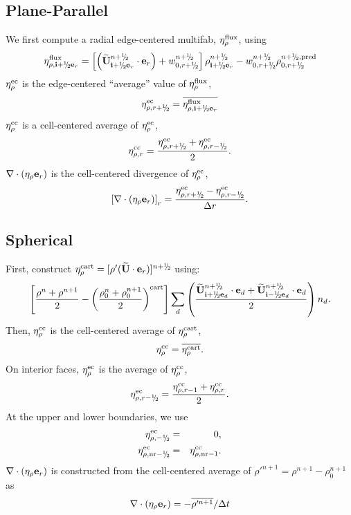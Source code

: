 \subsection{Plane-Parallel}
We first compute a radial edge-centered multifab, $\eta_{\rho}^{\rm flux}$, using
\begin{equation}
\eta_{\rho,\ib+\myhalf\eb_r}^{\rm flux} = \left[\left(\Ubt_{\ib+\myhalf\eb_r}^{n+\myhalf}\cdot\eb_r\right) + w_{0,r+\myhalf}^{n+\myhalf}\right] \rho_{\ib+\myhalf\eb_r}^{n+\myhalf} - w_{0,r+\myhalf}^{n+\myhalf}\rho_{0,r+\myhalf}^{n+\myhalf, {\rm pred}}
\end{equation}
$\eta_{\rho}^{\rm ec}$ is the edge-centered ``average'' value of $\eta_{\rho}^{\rm flux}$,
\begin{equation}
\eta_{\rho,r+\myhalf}^{\rm ec} = \overline{\eta_{\rho,\ib+\myhalf\eb_r}^{\rm flux}}
\end{equation}
$\eta_{\rho}^{\rm cc}$ is a cell-centered average of $\eta_{\rho}^{\rm ec}$,
\begin{equation}
\eta_{\rho,r}^{\rm cc} = \frac{\eta_{\rho,r+\myhalf}^{\rm ec} + \eta_{\rho,r-\myhalf}^{\rm ec}}{2}.
\end{equation}
$\nabla\cdot(\eta_{\rho}{\bf e}_r)$ is the cell-centered divergence of $\eta_{\rho}^{\rm ec}$,
\begin{equation}
\left[\divetarho\right]_r = \frac{\eta_{\rho,r+\myhalf}^{\rm ec} - \eta_{\rho,r-\myhalf}^{\rm ec}}{\Delta r}.
\end{equation}

\subsection{Spherical}\label{Sec:eta Spherical}
First, construct $\eta_{\rho}^{\rm cart} =
[\rho'(\Ubt\cdot\eb_r)]^{n+\myhalf}$ using:
\begin{equation}
\left[\frac{\rho^n+\rho^{n+1}}{2}-\left(\frac{\rho_0^n+\rho_0^{n+1}}{2}\right)^{\rm cart}\right] \sum_d\left(\frac{\Ubt_{\ib+\myhalf\eb_d}^{n+\myhalf}\cdot\eb_d+\Ubt_{\ib-\myhalf\eb_d}^{n+\myhalf}\cdot\eb_d}{2}\right)n_d.
\end{equation}
Then, $\eta_{\rho}^{\rm cc}$ is the cell-centered average of $\eta_{\rho}^{\rm cart}$,
\begin{equation}
\eta_{\rho}^{\rm cc} = \overline{\eta_{\rho}^{\rm cart}}.
\end{equation}
On interior faces, $\eta_{\rho}^{\rm ec}$ is the average of $\eta_{\rho}^{\rm cc}$,
\begin{equation}
\eta_{\rho,r-\myhalf}^{\rm ec} = \frac{\eta_{\rho,r-1}^{\rm cc} + \eta_{\rho,r}^{\rm cc}}{2}.
\end{equation}
At the upper and lower boundaries, we use
\begin{eqnarray}
\eta_{\rho,-\myhalf}^{\rm ec} &=& 0, \\
\eta_{\rho,{\rm nr}-\myhalf}^{\rm ec} &=& \eta_{\rho,{\rm nr}-1}^{\rm cc}.
\end{eqnarray}
$\nabla\cdot(\eta_{\rho}{\bf e}_r)$ is constructed from the cell-centered average of
$\rho'^{n+1} = \rho^{n+1} - \rho_0^{n+1}$ as
\begin{equation}
\nabla\cdot(\eta_{\rho}{\bf e}_r) = -\overline{\rho'^{n+1}}/\Delta t
\end{equation}

